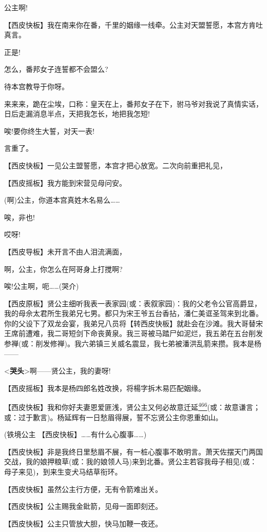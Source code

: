 公主啊!

【西皮快板】我在南来你在番，千里的姻缘一线牵。公主对天盟誓愿，本宫方肯吐真言。

正是!

怎么，番邦女子连誓都不会盟么?

待本宫教导于你呀。

来来来，跪在尘埃，口称：皇天在上，番邦女子在下，驸马爷对我说了真情实话，日后走漏消息半点，天把我怎长，地把我怎短!

唉!要你终生大誓，对天一表!

言重了。

【西皮快板】一见公主盟誓愿，本宫才把心放宽。二次向前重把礼见，

【西皮摇板】我方能到宋营见母问安。

(啊)公主，你道本宫真姓木名易么\ldots{}\ldots{}

唉，非也!

哎呀!

【西皮导板】未开言不由人泪流满面，

啊，公主，你怎么在阿哥身上打搅啊?

唉!公主啊，呃\ldots{}\ldots{}(哭介)

【西皮原板】贤公主细听我表一表家园(或：表叙家园)：我的父老令公官高爵显，我的母佘太君所生我弟兄七男。都只为宋王爷五台香拈，潘仁美诓圣驾来到北番。你的父设下了双龙会宴，我弟兄八员将【转西皮快板】就赴会在沙滩。我大哥替宋王席前遭难，我二哥短剑下命丧黄泉。我三哥被马踏尸如泥烂，我五弟在五台削发参禅(或：削发修禅)。我六弟镇三关威名震显，我七弟被潘洪乱箭来攒。我本是杨------

\textless{}\textbf{哭头}\textgreater{}啊------贤公主，我的妻呀!

【西皮摇板】我本是杨四郎名姓改换，将楊字拆木易匹配姻缘。

【西皮快板】我和你好夫妻恩爱匪浅，贤公主又何必故意迁延\protect\hyperlink{fn466}{\textsuperscript{466}}(或：故意谦言；或：过于歉言)。杨延辉有一日愁眉得展，誓不忘贤公主你恩重如山。

(铁境公主 【西皮快板】\ldots{}\ldots{}有什么心腹事\ldots{}\ldots{})

【西皮快板】非是我终日里愁眉不展，有一桩心腹事不敢明言。萧天佐摆天门两国交战，我的娘押粮草(或：我的娘领人马)来到北番。贤公主若容我母子相见(或：母子来见)，到来生变犬马结草衔环。

【西皮快板】虽然公主行方便，无有令箭难出关。

【西皮快板】公主赐我金鈚箭，见母一面即刻还。

【西皮快板】公主只管放大胆，快马加鞭一夜还。

